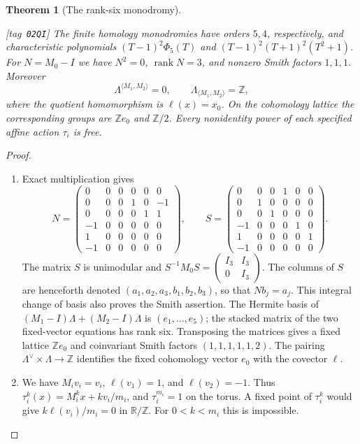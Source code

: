 \documentclass[11pt,a4paper]{article}
\numberwithin{equation}{section}
\newtheorem{theorem}{Theorem}[section]
\theoremstyle{definition}
\newcommand{\StatementRecord}[4]{{\upshape\footnotesize[tag~\texttt{#3}]}\enspace\ignorespaces}
\begin{document}
\begin{theorem}[The rank-six monodromy]\hypertarget{tag-02QI}{}\label{night:P1.1}
\StatementRecord{night:P1.1}{proved}{02QI}{the definitions and constructions stated in the proof}
The finite homology monodromies have orders $5,4$, respectively, and
characteristic polynomials
$(T-1)^2\Phi _5(T)$ and $(T-1)^2(T+1)^2(T^2+1)$.
For $N=M_0-I$ we have $N^2=0$, $\operatorname{rank}N=3$, and
nonzero Smith factors $1,1,1$.  Moreover
\[
 \Lambda^{\langle M_1,M_2\rangle}=0,\qquad
 \Lambda_{\langle M_1,M_2\rangle}=\mathbb Z,
\]
where the quotient homomorphism is $\ell(x)=x_0$.
On the cohomology lattice the corresponding groups are $\mathbb Ze_0$
and $\mathbb Z/2$.  Every nonidentity power of each specified affine
action $\tau_i$ is free.
\end{theorem}
\begin{proof}
\begin{enumerate}[label=\arabic*.]
\item Exact multiplication gives
\[
N=\begin{pmatrix}
0&0&0&0&0&0\\0&0&0&1&0&-1\\0&0&0&0&1&1\\
-1&0&0&0&0&0\\1&0&0&0&0&0\\-1&0&0&0&0&0
\end{pmatrix},\qquad
S=\begin{pmatrix}
0&0&0&1&0&0\\0&1&0&0&0&0\\0&0&1&0&0&0\\
-1&0&0&0&1&0\\1&0&0&0&0&1\\-1&0&0&0&0&0
\end{pmatrix}.
\]
The matrix $S$ is unimodular and
$S^{-1}M_0S=\left(\begin{smallmatrix}I_3&I_3\\0&I_3\end{smallmatrix}\right)$.
The columns of $S$ are henceforth denoted
$(a_1,a_2,a_3,b_1,b_2,b_3)$, so that $Nb_j=a_j$.
This integral change of basis also proves the Smith assertion.
The Hermite basis of
$(M_1-I)\Lambda+(M_2-I)\Lambda$ is $(e_1,\ldots,e_5)$;
the stacked matrix of the two fixed-vector equations has rank six.
Transposing the matrices gives a fixed lattice $\mathbb Ze_0$ and
coinvariant Smith factors $(1,1,1,1,1,2)$.  The pairing
$\Lambda^\vee\times\Lambda\longrightarrow\mathbb Z$ identifies the
fixed cohomology vector $e_0$ with the covector $\ell$.

\item We have $M_iv_i=v_i$, $\ell(v_1)=1$, and $\ell(v_2)=-1$.
Thus $\tau_i^k(x)=M_i^kx+kv_i/m_i$, and $\tau_i^{m_i}=1$ on the
torus.  A fixed point of $\tau_i^k$ would give
$k\ell(v_i)/m_i=0$ in $\mathbb R/\mathbb Z$.  For
$0<k<m_i$ this is impossible.

\end{enumerate}
\end{proof}
\end{document}
